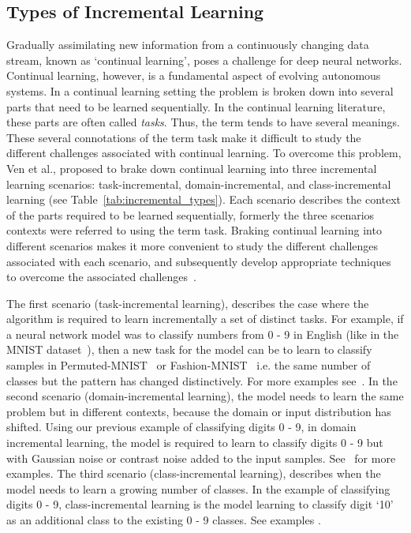 \subsection{Types of Incremental Learning}
Gradually assimilating new information from a continuously changing data stream, known as `continual learning', poses a challenge for deep neural networks. 
%
Continual learning, however, is a fundamental aspect of evolving autonomous systems.
%
In a continual learning setting the problem is broken down into several parts that need to be learned sequentially.
%
In the continual learning literature, these parts are often called \textit{tasks}. Thus, the term tends to have several meanings. 
%
These several connotations of the term task make it difficult to study the different challenges associated with continual learning. 
%
To overcome this problem, Ven et al.\cite{Ven2022}, proposed to brake down continual learning into three incremental learning scenarios: task-incremental, domain-incremental, and class-incremental learning (see Table~\ref{tab:incremental_types}). 
%
Each scenario describes the context of the parts required to be learned sequentially, formerly the three scenarios contexts were referred to using the term task.
%
Braking continual learning into different scenarios makes it more convenient to study the different challenges associated with each scenario, and subsequently develop appropriate techniques to overcome the associated challenges~\cite{li2022energy,lesort2021understanding,zeno2018task,gepperth2016incremental}. 
%

The first scenario (task-incremental learning), describes the case where the algorithm is required to learn incrementally a set of distinct tasks.
%
For example, if a neural network model was to classify numbers from 0 - 9 in English (like in the MNIST dataset~\cite{deng2012mnist}), then a new task for the model can be to learn to classify samples in Permuted-MNIST~\cite{Goodfellow2014} or Fashion-MNIST~\cite{Xiao2017} i.e. the same number of classes but the pattern has changed distinctively. For more examples see~\cite{ramesh2021model, masse2018alleviating, ruvolo2013ella}.
%
In the second scenario (domain-incremental learning), the model needs to learn the same problem but in different contexts, because the domain or input distribution has shifted. Using our previous example of classifying digits 0 - 9, in domain incremental learning, the model is required to learn to classify digits 0 - 9 but with Gaussian noise or contrast noise added to the input samples. See~\cite{JehanzebMirza2022, ke2021classic} for more examples.
%
The third scenario (class-incremental learning), describes when the model needs to learn a growing number of classes. In the example of classifying digits 0 - 9, class-incremental learning is the model learning to classify digit `10' as an additional class to the existing 0 - 9 classes. See examples \cite{Tao2020, rebuffi2017icarl}.

